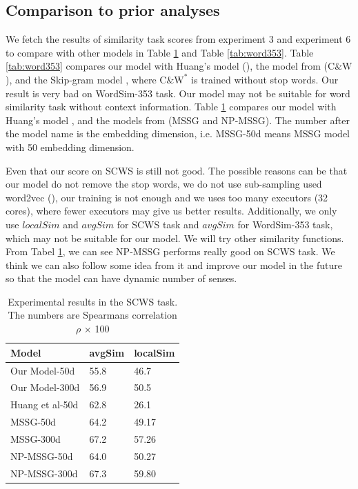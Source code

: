 \subsection{Comparison to prior analyses}

We fetch the results of similarity task scores from experiment 3 and experiment 6 to compare with other models in Table \ref{tab:SCWS} and Table \ref{tab:word353}. Table \ref{tab:word353} compares our model with Huang's model (\cite{HuangSocherEtAl2012}), the model from \citep{CollobertWeston2008} ($\mathrm{C}\&\mathrm{W}$), and the Skip-gram model \citep{MikolovSutskeverEtAl2013}, where $\mathrm{C}\&\mathrm{W}^*$ is trained without stop words. Our result is very bad on WordSim-353 task. Our model may not be suitable for word similarity task without context information. Table \ref{tab:SCWS} compares our model with Huang's model \citep{HuangSocherEtAl2012} , and the models from \citep{NeelakantanShankarEtAl2015} (MSSG and NP-MSSG). The number after the model name is the embedding dimension, i.e. MSSG-50d means MSSG model with 50 embedding dimension. 

Even that our score on SCWS is still not good.  The possible reasons can be that our model do not remove the stop words, we do not use sub-sampling used word2vec (\cite{MikolovSutskeverEtAl2013}),  our training is not enough and we uses too many executors (32 cores), where fewer executors may give us better results. Additionally, we only use $localSim$ and $avgSim$ for SCWS task and $avgSim$ for WordSim-353 task, which may not be suitable for our model. We will try other similarity functions. From Tabel \ref{tab:SCWS}, we can see NP-MSSG performs really good on SCWS task. We think we can also follow some idea from it and improve our model in the future so that the model can have dynamic number of senses.



\begin{table}
\caption{Experimental results in the SCWS task. The numbers are Spearmans correlation $\rho$ $\times$ 100} \label{tab:SCWS} 
\begin{center}
\begin{tabular}{|l|l|l|}
\hline
Model & avgSim & localSim  \\ 
\hline
Our Model-50d & 55.8 & 46.7 \\
\hline
Our Model-300d & 56.9 & 50.5	\\ 
\hline
Huang et al-50d  & 62.8	& 26.1 \\ 
\hline
MSSG-50d  & 64.2	 & 49.17 \\ 
\hline
MSSG-300d  & 67.2 & 57.26 \\ 
\hline
NP-MSSG-50d  & 64.0 & 50.27 \\ 
\hline
NP-MSSG-300d  & 67.3 & 59.80 \\ 
\hline
\end{tabular}
\end{center}
\end{table}


